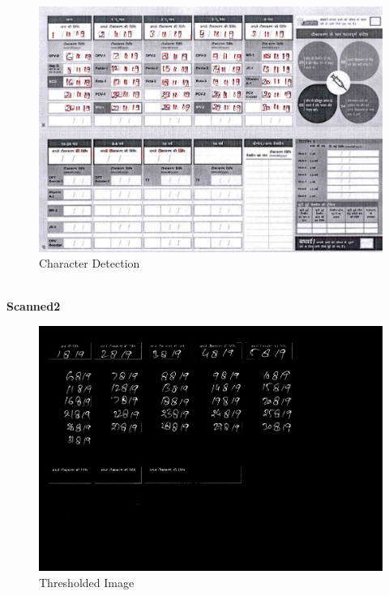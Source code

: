 \documentclass{article}
\begin{document}
    \begin{figure}[!htb]
    \minipage{\textwidth}
    \begin{center}
      \includegraphics[scale=.15]{4/.report/_char/s1.jpg}
      \caption{Character Detection}
    \end{center}
    \endminipage
    \end{figure}
\pagebreak \\
\textbf{Scanned2}
    \begin{figure}[!htb]
    \minipage{\textwidth}
    \begin{center}
      \includegraphics[scale=.25]{4/.report/_thresh/s2.jpg}
      \caption{Thresholded Image}
    \end{center}
    \endminipage
    \end{figure}
\end{document}
